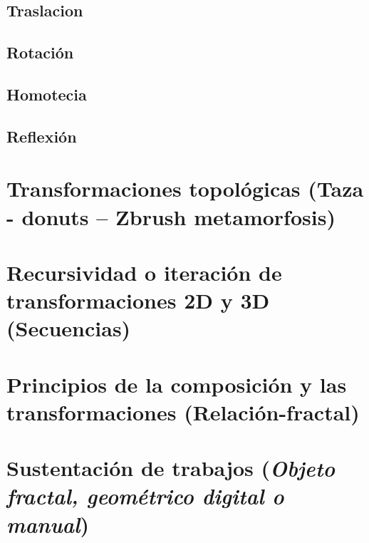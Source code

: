 \documentclass[
  11pt,
]{krantz}
\theoremstyle{definition}
\theoremstyle{definition}
\theoremstyle{definition}
\theoremstyle{definition}
\theoremstyle{remark}
\begin{document}
\hypertarget{traslacion}{%
\subsection{Traslacion}\label{traslacion}}

\hypertarget{rotaciuxf3n}{%
\subsection{Rotación}\label{rotaciuxf3n}}

\hypertarget{homotecia}{%
\subsection{Homotecia}\label{homotecia}}

\hypertarget{reflexiuxf3n}{%
\subsection{Reflexión}\label{reflexiuxf3n}}

\hypertarget{transformaciones-topoluxf3gicas-taza---donuts-zbrush-metamorfosis}{%
\section{Transformaciones topológicas (Taza - donuts -- Zbrush metamorfosis)}\label{transformaciones-topoluxf3gicas-taza---donuts-zbrush-metamorfosis}}

\hypertarget{recursividad-o-iteraciuxf3n-de-transformaciones-2d-y-3d-secuencias}{%
\section{Recursividad o iteración de transformaciones 2D y 3D (Secuencias)}\label{recursividad-o-iteraciuxf3n-de-transformaciones-2d-y-3d-secuencias}}

\hypertarget{principios-de-la-composiciuxf3n-y-las-transformaciones-relaciuxf3n-fractal}{%
\section{Principios de la composición y las transformaciones (Relación-fractal)}\label{principios-de-la-composiciuxf3n-y-las-transformaciones-relaciuxf3n-fractal}}

\hypertarget{sustentaciuxf3n-de-trabajos}{%
\section{\texorpdfstring{Sustentación de trabajos (\emph{Objeto fractal, geométrico digital o manual})}{Sustentación de trabajos ()}}\label{sustentaciuxf3n-de-trabajos}}
\end{document}
